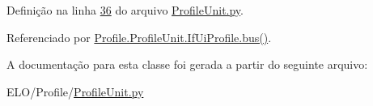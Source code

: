 Definição na linha \hyperlink{ProfileUnit_8py_source_l00036}{36} do arquivo \hyperlink{ProfileUnit_8py_source}{Profile\-Unit.\-py}.



Referenciado por \hyperlink{classProfile_1_1ProfileUnit_1_1IfUiProfile_ac3d0a7a780dcf729b9f3cf1fff243a78}{Profile.\-Profile\-Unit.\-If\-Ui\-Profile.\-bus()}.



A documentação para esta classe foi gerada a partir do seguinte arquivo\-:\begin{DoxyCompactItemize}
\item 
E\-L\-O/\-Profile/\hyperlink{ProfileUnit_8py}{Profile\-Unit.\-py}\end{DoxyCompactItemize}
